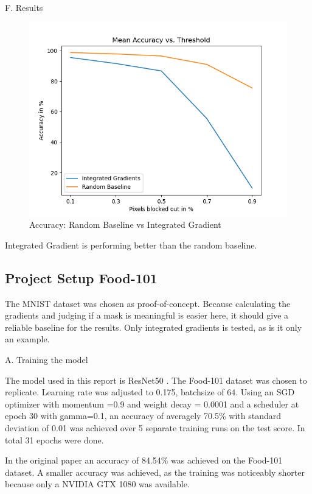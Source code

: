 F. Results

\begin{figure}[h!]
	\centering
	\includegraphics[width=150mm]{figs/mean_accuracy_vs_threshold}
	\caption{Accuracy: Random Baseline vs Integrated Gradient}
	\label{fig:Accuracy}
	
\end{figure}

Integrated Gradient is performing better than the random baseline.


\subsection{Project Setup Food-101}

The MNIST dataset \cite{deng2012mnist} was chosen as proof-of-concept. Because calculating the gradients and judging if a mask is meaningful is easier here, it should give a reliable baseline for the results. Only integrated gradients is tested, as is it only an example. 

A. Training the model

The model used in this report is ResNet50 \cite{he2015deep}. The Food-101 \cite{bossard14} dataset was chosen to replicate. Learning rate was adjusted to 0.175, batchsize of 64. Using an SGD optimizer with momentum =0.9 and weight decay = 0.0001 and a scheduler at epoch 30 with gamma=0.1, an accuracy of averagely 70.5\% with standard deviation of 0.01  was achieved over 5 separate training runs on the test score. In total 31 epochs were done. 

In the original paper an accuracy of 84.54\% was achieved on the Food-101 dataset.  A smaller accuracy was achieved, as the training was noticeably shorter because only a NVIDIA GTX 1080 was available.

